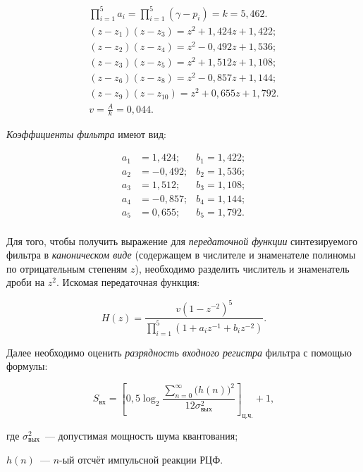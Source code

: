 \begin{gather*}
  \prod_{i=1}^{5}a_i = \prod_{i=1}^{5}(\gamma - p_i) = k = 5{,}462.\\
  (z - z_1)(z - z_3)   = z^2 + 1{,}424z + 1{,}422;\\
  (z - z_2)(z - z_4)   = z^2 - 0{,}492z + 1{,}536;\\
  (z - z_3)(z - z_5)   = z^2 + 1{,}512z + 1{,}108;\\
  (z - z_6)(z - z_8)   = z^2 - 0{,}857z + 1{,}144;\\
  (z - z_9)(z - z_{10}) = z^2 + 0{,}655z + 1{,}792.\\
  v = \frac{A}{k} = 0{,}044.
\end{gather*}

\textit{Коэффициенты фильтра} имеют вид:

\begin{align*}
  a_1& =    1{,}424; & b_1 =  1{,}422;\\ 
  a_2& =  - 0{,}492; & b_2 =  1{,}536;\\ 
  a_3& =    1{,}512; & b_3 =  1{,}108;\\ 
  a_4& =  - 0{,}857; & b_4 =  1{,}144;\\ 
  a_5& =    0{,}655; & b_5 =  1{,}792.\\ 
\end{align*}

\point Для того, чтобы получить выражение для \textit{передаточной
  функции} синтезируемого фильтра в \emph{каноническом виде}
(содержащем в числителе и знаменателе полиномы по отрицательным
степеням $z$), необходимо разделить числитель и знаменатель дроби на
$z^2$. Искомая передаточная функция:

\begin{equation}
  \label{eq:pered_kanon}
  H(z) = \frac{v(1 - z^{-2})^5}{\prod_{i=1}^5\left(1 + a_i z^{-1} +b_i
    z^{-2}\right)}.
\end{equation}

\point Далее необходимо оценить \textit{разрядность входного регистра}
фильтра с помощью формулы:

\begin{equation}
  \label{eq:rekurs_razr}
  S_{\text{вх}} = \left[0{,}5 \log_2 \frac{\displaystyle
      \sum_{n=0}^{\infty} \bigl(h(n)\bigr)^2}{12
      \sigma^2_{\text{вых}}}\right]_{\text{ц.ч.}} + 1,
\end{equation}

\begin{ESKDexplanation}
\item[где ] $\sigma^2_{\text{вых}}$~--- допустимая мощность шума
  квантования;
\item $h(n)$~--- $n$-ый отсчёт импульсной реакции РЦФ.
\end{ESKDexplanation}


